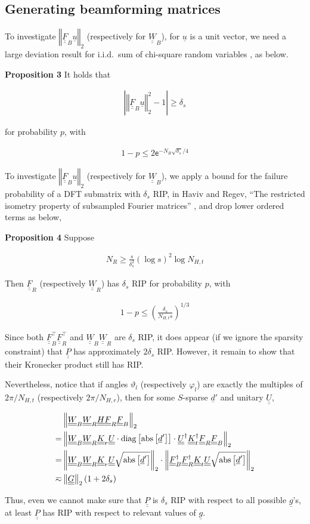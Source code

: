 \documentclass[journal]{IEEEtran}
\renewcommand {\d} {\delta}
\newcommand {\f} {\varphi}
\renewcommand {\th} {\vartheta}
\newcommand {\D} {\cdot}
\newcommand {\Tr} {\intercal}
\newcommand {\m} [1] {\( #1 \)}
\newcommand {\V} [1] {\underline {#1}}
\newcommand {\M} [1] {\underline {\underline {#1}}}
\newcommand {\RB} [1] {\left( #1 \right)}
\newcommand {\SB} [1] {\left[ #1 \right]}
\newcommand {\Nm} [1] {\left \vert #1 \right \vert}
\newcommand {\VNm} [1] {\left \Vert #1 \right \Vert}
\newcommand {\R} [1] {\sqrt {#1}}
\newcommand {\Disp} [1] {
   \begin {align*}
      #1
   \end {align*}
}
\begin{document}

\subsection {Generating beamforming matrices}

To investigate \m {\VNm {\M {F} _B \V {u}} _2} (respectively for \m {\M {W} _B}), for \m {\V {u}} is a unit vector, we need a large deviation result for i.i.d.\ sum of chi-square random variables \cite {LaM00}, as below.

\textbf {Proposition 3}
It holds that
%
\Disp {
\Nm {\VNm {\M {F} _B \V {u}} _2 ^2 - 1}
\geq \d_s 
}
for probability \m {p}, with
\Disp {
1 -p
\leq 2 \mathsf {e} ^{-N_R \R {\d_s} /4} 
}

To investigate \m {\VNm {\M {F} _B \V {u}} _2} (respectively for \m {\M {W} _B}), we apply a bound for the failure probability of a DFT submatrix with \m {\d_s} RIP, in Haviv and Regev, ``The restricted isometry property of subsampled Fourier matrices'' \cite {KlM17}, and drop lower ordered terms as below,

\textbf {Proposition 4}
Suppose
\Disp {
N_R
\geq \frac {s} {\d_s^2} \RB {\log s}^2 \log N_{H,t}
}
Then \m {\M {F}_R} (respectively \m {\M {W} _R}) has \m {\d_s} RIP for probability \m {p}, with
\Disp {
1 -p
\leq \RB {\frac {\d_s} {N_{H,t} s}} ^{1/3} 
}

Since both \m {\M {F}_B^\Tr \M {F}_R^\Tr} and \m {\M {W}_B \M {W}_R} are \m {\d_s} RIP, it does appear (if we ignore the sparsity constraint) that \m {\M {P}} has approximately \m {2\d_s} RIP.
However, it remain to show that their Kronecker product still has RIP.

Nevertheless, notice that if angles \m {\th_l} (respectively \m {\f_l}) are exactly the multiples of \m {2 \pi / N_{H,t}} (respectively \m {2 \pi / N_{H,r}}), then for some \m {S}-sparse \m {\V {d}'} and unitary \m {\M {U}},
\Disp {
&\VNm {\M {W} _B \M {W} _R \M {H} \M {F} _R \M {F} _B} _2 \notag \\
= &\VNm {
   \M {W} _B \M {W} _R \M {K} _r \M {U} \D
   \mathrm {diag} \SB {\mathrm {abs} \SB {\V {d}'}} \D
   \M {U} ^\dagger \M {K} _t ^\dagger \M {F} _R \M {F} _B} _2 \notag \\
= &\VNm {
   \M {W} _B \M {W} _R \M {K} _r \M {U}
   \R {\mathrm {abs} \SB {\V {d}'}}} _2 \D
   \VNm {\M {F} _B ^\dagger \M {F} _R ^\dagger \M {K} _t \M {U}
   \R {\mathrm {abs} \SB {\V {d}'}}} _2 \notag \\
\eqsim &\VNm {\M {G}} _2 \RB {1 +2\d_s} 
}
Thus, even we cannot make sure that \m {\M {P}} is \m {\d_s} RIP with respect to all possible \m {\V {g}}'s, at least \m {\M {P}} has RIP with respect to relevant values of \m {\V {g}}.
\end{document}
